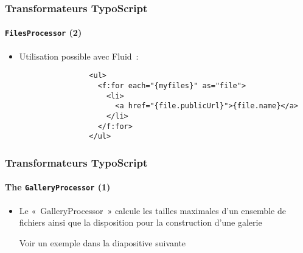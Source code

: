 
\begin{frame}[fragile]
	\frametitle{Transformateurs TypoScript}
	\framesubtitle{\texttt{FilesProcessor} (2)}

	\lstset{basicstyle=\tiny\ttfamily}

	\begin{itemize}

		\item Utilisation possible avec Fluid~:

			\begin{lstlisting}
				<ul>
				  <f:for each="{myfiles}" as="file">
				    <li>
				      <a href="{file.publicUrl}">{file.name}</a>
				    </li>
				  </f:for>
				</ul>
			\end{lstlisting}

	\end{itemize}

\end{frame}


\begin{frame}[fragile]
	\frametitle{Transformateurs TypoScript}
	\framesubtitle{The \texttt{GalleryProcessor} (1)}

	\lstset{basicstyle=\tiny\ttfamily}

	\begin{itemize}


		\item Le «~GalleryProcessor~» calcule les tailles maximales d'un ensemble de
			fichiers ainsi que la disposition pour la construction d'une galerie

			\small
				Voir un exemple dans la diapositive suivante
			\normalsize

	\end{itemize}

\end{frame}

